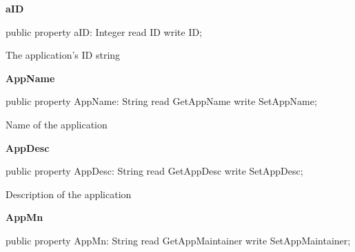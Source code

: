 \documentclass{report}
\newif\ifpdf
\begin{document}
\begin{list}{}{
\setlength{\itemindent}{0cm}
\setlength{\listparindent}{0cm}
\setlength{\leftmargin}{\evensidemargin}
\addtolength{\leftmargin}{\tmplength}
\settowidth{\labelsep}{X}
\addtolength{\leftmargin}{\labelsep}
\setlength{\labelwidth}{\tmplength}
}
\label{lentries.TListEntry-aID}
\item[\textbf{aID}\hfill]
\ifpdf
\begin{flushleft}
\fi
\begin{ttfamily}
public property aID: Integer read ID write ID;\end{ttfamily}

\ifpdf
\end{flushleft}
\fi


\par The application's ID string\label{lentries.TListEntry-AppName}
\item[\textbf{AppName}\hfill]
\ifpdf
\begin{flushleft}
\fi
\begin{ttfamily}
public property AppName: String read GetAppName write SetAppName;\end{ttfamily}

\ifpdf
\end{flushleft}
\fi


\par Name of the application\label{lentries.TListEntry-AppDesc}
\item[\textbf{AppDesc}\hfill]
\ifpdf
\begin{flushleft}
\fi
\begin{ttfamily}
public property AppDesc: String read GetAppDesc write SetAppDesc;\end{ttfamily}

\ifpdf
\end{flushleft}
\fi


\par Description of the application\label{lentries.TListEntry-AppMn}
\item[\textbf{AppMn}\hfill]
\ifpdf
\begin{flushleft}
\fi
\begin{ttfamily}
public property AppMn: String read GetAppMaintainer write SetAppMaintainer;\end{ttfamily}

\ifpdf
\end{flushleft}
\fi



\end{list}
\end{document}
